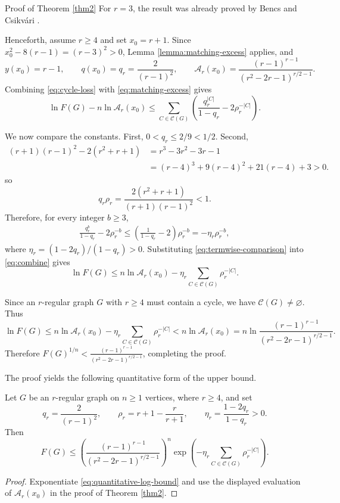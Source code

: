 \documentclass[11pt, a4paper]{article}
\begin{document}
\begin{proofthm}{Proof of Theorem \ref{thm2}}
For $r=3$, the result was already proved by Bencs and Csikvári \cite{Bencs2023}.

Henceforth, assume $r\geq4$ and set $x_0=r+1$.
Since $x_0^2-8(r-1)=(r-3)^2>0$,
Lemma \ref{lemma:matching-excess} applies, and
\[
 y(x_0)=r-1, \qquad q(x_0)=q_r=\frac2{(r-1)^2},
 \qquad \mathcal{A}_r(x_0)=\frac{(r - 1)^{r-1}}{(r^2 - 2r - 1)^{r/2-1}}.
\]
Combining \eqref{eq:cycle-loss} with \eqref{eq:matching-excess} gives
\begin{equation}\label{eq:combine}
 \ln F(G)-n\ln \mathcal{A}_r(x_0)
 \leq\sum_{C\in\mathcal{C}(G)}
       \left(\frac{q_r^{|C|}}{1-q_r}-2\rho_r^{-|C|}\right).
\end{equation}

We now compare the constants.
First, $0<q_r\leq2/9<1/2$.
Second,
\begin{align*}
 (r+1)(r-1)^2-2(r^2+r+1)
 &=r^3-3r^2-3r-1\\
 &=(r-4)^3+9(r-4)^2+21(r-4)+3>0.
\end{align*}
so
\[
 q_r\rho_r
 =\frac{2(r^2+r+1)}{(r+1)(r-1)^2}<1.
\]
Therefore, for every integer $b\geq3$,
\begin{align}
 \frac{q_r^b}{1-q_r}-2\rho_r^{-b}
 \leq\left(\frac1{1-q_r}-2\right)\rho_r^{-b}
 =-\eta_r \rho_r^{-b}, \label{eq:termwise-comparison}
\end{align}
where $\eta_r=(1-2q_r)/(1-q_r)>0$.
Substituting \eqref{eq:termwise-comparison} into \eqref{eq:combine} gives
\begin{equation}\label{eq:quantitative-log-bound}
 \ln F(G)\leq n\ln \mathcal{A}_r(x_0)
       -\eta_r\sum_{C\in\mathcal{C}(G)}\rho_r^{-|C|}.
\end{equation}


Since an $r$-regular graph $G$ with $r\geq4$ must contain a cycle, we have $\mathcal{C}(G)\neq\varnothing$.
Thus
\[
 \ln F(G)\leq n\ln \mathcal{A}_r(x_0)
       -\eta_r\sum_{C\in\mathcal{C}(G)}\rho_r^{-|C|}
       <n\ln \mathcal{A}_r(x_0)
       =n\ln \frac{(r - 1)^{r-1}}{(r^2 - 2r - 1)^{r/2-1}}.
\]
Therefore $F(G)^{1/n}<\frac{(r - 1)^{r-1}}{(r^2 - 2r - 1)^{r/2-1}}$,
completing the proof.
\end{proofthm}

The proof yields the following quantitative form of the upper bound.
\begin{corollary}\label{cor:cycle-correction}
Let $G$ be an $r$-regular graph on $n\geq1$ vertices, where $r\geq4$, and set
\[
q_r=\frac{2}{(r-1)^2},\qquad
\rho_r=r+1-\frac{r}{r+1},\qquad
\eta_r=\frac{1-2q_r}{1-q_r}>0.
\]
Then
\[
F(G)\leq
\left(\frac{(r-1)^{r-1}}{(r^2-2r-1)^{r/2-1}}\right)^n
\exp\!\left(-\eta_r\sum_{C\in\mathcal{C}(G)}\rho_r^{-|C|}\right).
\]
\end{corollary}
\begin{proof}
Exponentiate \eqref{eq:quantitative-log-bound} and use the displayed evaluation of $\mathcal{A}_r(x_0)$ in the proof of Theorem \ref{thm2}.
\end{proof}
\end{document}
